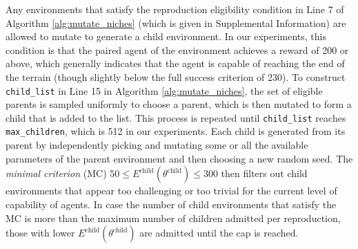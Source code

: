 \documentclass{article}
\newcommand{\todo}[1]{\comments{\textcolor{red}{[TODO: #1]}}}
\newcommand{\jc}[1]{\comments{\textcolor{deepForestGreen}{[JC: #1]}}}
\newcommand{\ks}[1]{\comments{\textcolor{purple}{[Ken: #1]}}}
\newcommand{\rw}[1]{\comments{\textcolor{blue}{[Rui: #1]}}}
\newcommand{\comments}[1]{#1}
\begin{document}
Any environments that satisfy the reproduction eligibility condition in Line 7 of Algorithm \ref{alg:mutate_niches} (which is given in Supplemental Information) are allowed to mutate to generate a child environment. In our experiments, this condition is that the paired agent of the environment achieves a reward of 200 or above,  which generally indicates that the agent is capable of reaching the end of the terrain (though slightly below the full success criterion of 230). 
To construct \texttt{child\_list} in Line 15 in Algorithm \ref{alg:mutate_niches}, the set of eligible parents is sampled uniformly to choose a parent, which is then mutated to form a child that is added to the list.  This process is repeated until \texttt{child\_list} reaches \texttt{max\_children}, which is 512 in our experiments.  Each child is generated from its parent by independently picking and mutating some or all the available parameters of the parent environment and then choosing a new random seed.
The \emph{minimal criterion} (MC) $50 \leq E^{\textrm{child}}(\theta^{\textrm{child}}) \leq 300$ 
then filters out child environments that appear too challenging or too trivial for the current level of capability of agents. In case the number of child environments that satisfy the MC is more than the maximum number of children admitted per reproduction, those with lower $E^{\textrm{child}}(\theta^{\textrm{child}})$ are admitted until the cap is reached. 
\end{document}

